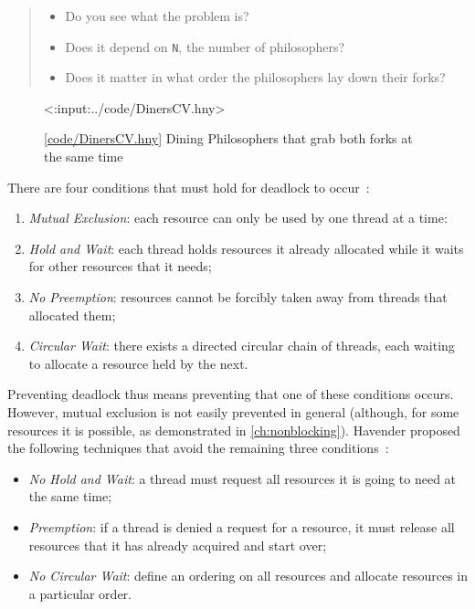 \documentclass{report}
\newcommand{\harmonylink}[1]{%
[\href{https://harmony.cs.cornell.edu/#1}{\underline{#1}}]%
}
\newenvironment{code}{
\tcolorbox
}{
\endtcolorbox
}
\begin{document}
{\begin{quote}
\begin{itemize}
\item Do you see what the problem is?
\item Does it depend on \texttt{N}, the number of philosophers?
\item Does it matter in what order the philosophers lay down their forks?
\end{itemize}
\end{quote}


\begin{figure}
\begin{code}
<{:input:../code/DinersCV.hny}>
\end{code}
\caption{\harmonylink{code/DinersCV.hny} Dining Philosophers that grab both forks at the same time}
\label{fig:dinerscv}
\end{figure}

\noindent
There are four conditions that must hold for deadlock to occur~\cite{CES71}:
\begin{enumerate}
\item \emph{Mutual Exclusion}: each resource can only be used by one thread at a time:
\item \emph{Hold and Wait}: each thread holds resources it already allocated while it
waits for other resources that it needs;
\item \emph{No Preemption}: resources cannot be forcibly taken away from threads that
allocated them;
\item \emph{Circular Wait}: there exists a directed circular chain of threads, each waiting
to allocate a resource held by the next.
\end{enumerate}

Preventing deadlock thus means preventing that one of these conditions occurs.
However, mutual exclusion is not easily prevented in general
(although, for some resources it is
possible, as demonstrated in \autoref{ch:nonblocking}).
Havender proposed the following techniques that avoid the remaining
three conditions~\cite{Havender68}:

\begin{itemize}
\item \emph{No Hold and Wait}: a thread must request all resources it is going to
need at the same time;
\item \emph{Preemption}: if a thread is denied a request for a resource, it must
release all resources that it has already acquired and start over;
\item \emph{No Circular Wait}: define an ordering on all resources and allocate
resources in a particular order.
\end{itemize}

}
\end{document}
